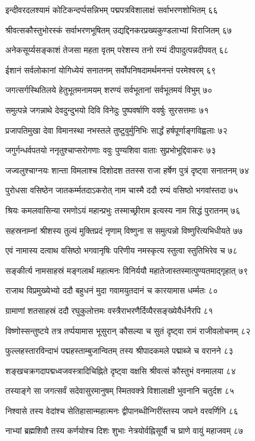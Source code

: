 इन्दीवरदलश्यामं कोटिकन्दर्प्पसन्निभम्
पद्मपत्रविशालाक्षं सर्वाभरणशोभितम् ६६

श्रीवत्सकौस्तुभोरस्कं सर्वाभरणभूषितम्
उद्यद्दिनकरप्रख्यकुण्डलाभ्यां विराजितम् ६७

अनेकसूर्य्यसङ्काशं तेजसा महता वृतम्
परेशस्य तनो रम्यं दीपादुत्पन्नदीपवत् ६८

ईशानं सर्वलोकानां योगिध्येयं सनातनम्
सर्वोपनिषदामर्थमनन्तं परमेश्वरम् ६९

जगत्सर्गस्थितिलये हेतुभूतमनामयम्
शरण्यं सर्वभूतानां सर्वभूतमयं विभुम् ७०

समुत्पन्ने जगन्नाथे देवदुन्दुभयो दिवि
विनेदुः पुष्पवर्षाणि ववर्षुः सुरसत्तमाः ७१

प्रजापतिमुखा देवा विमानस्था नभस्तले
तुष्टुवुर्मुनिभिः सार्द्धं हर्षपूर्णाङ्गविह्वलाः ७२

जगुर्गन्धर्वपतयो ननृतुश्चाप्सरोगणाः
ववुः पुण्यशिवा वाताः सुप्रभोभूद्दिवाकरः ७३

जज्वलुश्चाग्नयः शान्ता विमलाश्च दिशोदश
ततस्स राजा हर्षेण पुत्रं दृष्ट्वा सनातनम् ७४

पुरोधसा वसिष्ठेन जातकर्म्मतदाऽकरोत्
नाम चास्मै ददौ रम्यं वसिष्ठो भगवांस्तदा ७५

श्रियः कमलवासिन्या रमणोऽयं महान्प्रभुः
तस्माच्छ्रीराम इत्यस्य नाम सिद्धं पुरातनम् ७६

सहस्रनाम्नां श्रीशस्य तुल्यं मुक्तिप्रदं नृणाम्
विष्णुना स समुत्पन्नो विष्णुरित्यभिधीयते ७७

एवं नामास्य दत्वाथ वसिष्ठो भगवानृषिः
परिणीय नमस्कृत्य स्तुत्वा स्तुतिभिरेव च ७८

सङ्कीर्त्य नामसाहस्रं मङ्गलार्थं महात्मनः
विनिर्ययौ महातेजास्तस्मात्पुण्यतमाद्गृहात् ७९

राजाथ विप्रमुख्येभ्यो ददौ बहुधनं मुदा
गवामयुतदानं च कारयामास धर्म्मतः ८०

ग्रामाणां शतसाहस्रं ददौ रघुकुलोत्तमः
वस्त्रैराभरणैर्दिव्यैरसङ्ख्येयैर्धनैरपि ८१

विष्णोस्सन्तुष्टये तत्र तर्प्पयामास भूसुरान्
कौसल्या च सुतं दृष्ट्वा रामं राजीवलोचनम् ८२

फुल्लहस्तारविन्दाभं पद्महस्ताम्बुजान्वितम्
तस्य श्रीपादकमले पद्माब्जे च वरानने ८३

शङ्खचक्रगदापद्मध्वजवस्त्रादिचिह्निते
दृष्ट्वा वक्षसि श्रीवत्सं कौस्तुभं वनमालया ८४

तस्याङ्गे सा जगत्सर्वं सदेवासुरमानुषम्
स्मितवक्त्रे विशालाक्षी भुवनानि चतुर्दश ८५

निश्वासे तस्य वेदांश्च सेतिहासान्महात्मनः
द्वीपानब्धीन्गिरींस्तस्य जघने वरवर्णिनि ८६

नाभ्यां ब्रह्मशिवौ तस्य कर्णयोश्च दिशः शुभाः
नेत्रयोर्वह्निसूर्यौ च घ्राणे वायुं महाजवम् ८७

